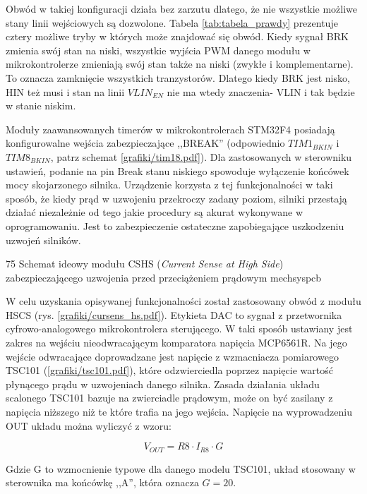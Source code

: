 Obwód w takiej konfiguracji działa bez zarzutu dlatego, że nie wszystkie możliwe stany linii wejściowych są dozwolone. Tabela \ref{tab:tabela_prawdy} prezentuje cztery możliwe tryby w których może znajdować się obwód. Kiedy sygnał BRK zmienia swój stan na niski, wszystkie wyjścia PWM danego modułu w mikrokontrolerze zmieniają swój stan także na niski (zwykłe i komplementarne). To oznacza zamknięcie wszystkich tranzystorów. Dlatego kiedy BRK jest nisko, HIN też musi i stan na linii $ VLIN_{EN} $ nie ma wtedy znaczenia- VLIN i tak będzie w stanie niskim.


Moduły zaawansowanych timerów w mikrokontrolerach STM32F4 posiadają konfigurowalne wejścia zabezpieczające ,,BREAK'' (odpowiednio $ TIM1_{BKIN} $ i $ TIM8_{BKIN} $, patrz schemat \ref{grafiki/tim18.pdf}). Dla zastosowanych w sterowniku ustawień, podanie na pin Break stanu niskiego spowoduje wyłączenie końcówek mocy skojarzonego silnika. Urządzenie korzysta z tej funkcjonalności w taki sposób, że kiedy prąd w uzwojeniu przekroczy zadany poziom, silniki przestają działać niezależnie od tego jakie procedury są akurat wykonywane w oprogramowaniu. Jest to zabezpieczenie ostateczne zapobiegające uszkodzeniu uzwojeń silników.

	{75}
	{Schemat ideowy modułu CSHS ({\it Current Sense at High Side}) zabezpieczającego uzwojenia przed przeciążeniem prądowym}
	{mechsyspcb}
	
W celu uzyskania opisywanej funkcjonalności został zastosowany obwód z modułu HSCS (rys. \ref{grafiki/cursens_hs.pdf}). Etykieta DAC to sygnał z przetwornika cyfrowo-analogowego mikrokontrolera sterującego. W taki sposób ustawiany jest zakres na wejściu nieodwracającym komparatora napięcia MCP6561R. Na jego wejście odwracające doprowadzane jest napięcie z wzmacniacza pomiarowego TSC101 (\ref{grafiki/tsc101.pdf}), które odzwierciedla poprzez napięcie wartość płynącego prądu w uzwojeniach danego silnika. Zasada działania układu scalonego TSC101 bazuje na zwierciadle prądowym, może on być zasilany z napięcia niższego niż te które trafia na jego wejścia. Napięcie na wyprowadzeniu OUT układu można wyliczyć z wzoru:

\begin{equation} \label{eq:mainboard1}
	V_{OUT} = R8 \cdot I_{R8} \cdot G
\end{equation}

Gdzie G to wzmocnienie typowe dla danego modelu TSC101, układ stosowany w sterownika ma końcówkę ,,A'', która oznacza $ G = 20 $.

